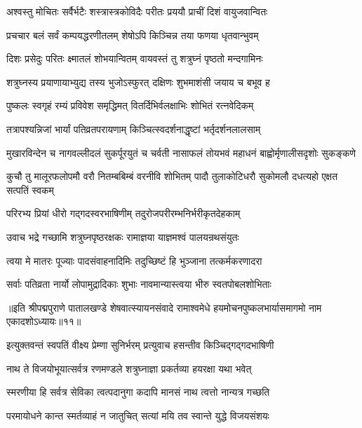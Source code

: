 \twolineshloka
{अश्वस्तु मोचितः सर्वैर्भटैः शस्त्रास्त्रकोविदैः}
{परीतः प्रययौ प्राचीं दिशं वायुजवान्वितः}%

\twolineshloka
{प्रचचार बलं सर्वं कम्पयद्धरणीतलम्}
{शेषोऽपि किञ्चिन्न तया फणया धृतवान्भुवम्}%

\twolineshloka
{दिशः प्रसेदुः परितः क्ष्मातलं शोभयान्वितम्}
{वायवस्तं तु शत्रुघ्नं पृष्ठतो मन्दगामिनः}%

\twolineshloka
{शत्रुघ्नस्य प्रयाणायाभ्युद्य तस्य भुजोऽस्फुरत्}
{दक्षिणः शुभमाशंसी जयाय च बभूव ह}%

\twolineshloka
{पुष्कलः स्वगृहं रम्यं प्रविवेश समृद्धिमत्}
{वितर्दिभिर्वलक्षाभिः शोभितं रत्नवेदिकम्}%

\twolineshloka
{तत्रापश्यन्निजां भार्यां पतिव्रतपरायणाम्}
{किञ्चित्स्वदर्शनाद्धृष्टां भर्तृदर्शनलालसाम्}%

\twolineshloka
{मुखारविन्देन च नागवल्लीदलं सुकर्पूरयुतं च चर्वती}
{नासाफलं तोयभवं महाधनं बाह्वोर्मृणालीसदृशोः सुकङ्कणे}%

\twolineshloka
{कुचौ तु मालूरफलोपमौ वरौ नितम्बबिम्बं वरनीवि शोभितम्}
{पादौ तुलाकोटिधरौ सुकोमलौ दधत्यहो एक्षत सत्पतिं स्वकम्}%

\twolineshloka
{परिरभ्य प्रियां धीरो गद्गदस्वरभाषिणीम्}
{तदुरोजपरीरम्भनिर्भरीकृतदेहकाम्}%

\twolineshloka
{उवाच भद्रे गच्छामि शत्रुघ्नपृष्ठरक्षकः}
{रामाज्ञया याज्ञमश्वं पालयन्रथसंयुतः}%

\twolineshloka
{त्वया मे मातरः पूज्याः पादसंवाहनादिमिः}
{तदुच्छिष्टं हि भुञ्जाना तत्कर्मकरणादरा}%

\twolineshloka
{सर्वाः पतिव्रता नार्यो लोपामुद्रादिकाः शुभाः}
{नावमान्यास्त्वया भीरु स्वतपोबलशोभिताः}%

{॥इति श्रीपद्मपुराणे पातालखण्डे शेषवात्स्यायनसंवादे रामाश्वमेधे हयमोचनपुष्कलभार्यासमागमो नाम एकादशोऽध्यायः॥११॥}



\twolineshloka
{इत्युक्तवन्तं स्वपतिं वीक्ष्य प्रेम्णा सुनिर्भरम्}
{प्रत्युवाच हसन्तीव किञ्चिद्गद्गदभाषिणी}%

\twolineshloka
{नाथ ते विजयोभूयात्सर्वत्र रणमण्डले}
{शत्रुघ्नाज्ञा प्रकर्तव्या हयरक्षा यथा भवेत्}%

\twolineshloka
{स्मरणीया हि सर्वत्र सेविका त्वत्पदानुगा}
{कदापि मानसं नाथ त्वत्तो नान्यत्र गच्छति}%

\twolineshloka
{परमायोधने कान्त स्मर्तव्याहं न जातुचित्}
{सत्यां मयि तव स्वान्ते युद्धे विजयसंशयः}%

